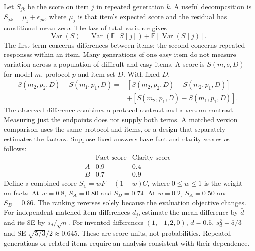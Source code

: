 Let $S_{jk}$ be the score on item $j$ in repeated generation $k$. A useful decomposition is $S_{jk}=\mu_j+\epsilon_{jk}$, where $\mu_j$ is that item's expected score and the residual has conditional mean zero. The law of total variance gives
\[
\operatorname{Var}(S)=\operatorname{Var}(\mathbb E[S\mid j])+
\mathbb E[\operatorname{Var}(S\mid j)].
\]
The first term concerns differences between items; the second concerns repeated responses within an item. Many generations of one easy item do not measure variation across a population of difficult and easy items.
A score is $S(m,p,D)$ for model $m$, protocol $p$ and item set $D$. With fixed $D$,
\[
\begin{aligned}
S(m_2,p_2,D)-S(m_1,p_1,D)
={}&[S(m_2,p_2,D)-S(m_2,p_1,D)]\\
&+[S(m_2,p_1,D)-S(m_1,p_1,D)].
\end{aligned}
\]
The observed difference combines a protocol contrast and a version contrast. Measuring just the endpoints does not supply both terms. A matched version comparison uses the same protocol and items, or a design that separately estimates the factors.
Suppose fixed answers have fact and clarity scores as follows:
\[
\begin{array}{c|cc}
&\text{Fact score}&\text{Clarity score}\\\hline
A&0.9&0.4\\B&0.7&0.9
\end{array}
\]
Define a combined score $S_w=wF+(1-w)C$, where $0\leq w\leq1$ is the weight on facts. At $w=0.8$, $S_A=0.80$ and $S_B=0.74$. At $w=0.2$, $S_A=0.50$ and $S_B=0.86$. The ranking reverses solely because the evaluation objective changes.
For independent matched item differences $d_j$, estimate the mean difference by $\bar d$ and its SE by $s_d/\sqrt n$. For invented differences $(1,-1,2,0)$, $\bar d=0.5$, $s_d^2=5/3$ and SE $\sqrt{5/3}/2\approx0.645$. These are score units, not probabilities. Repeated generations or related items require an analysis consistent with their dependence.

